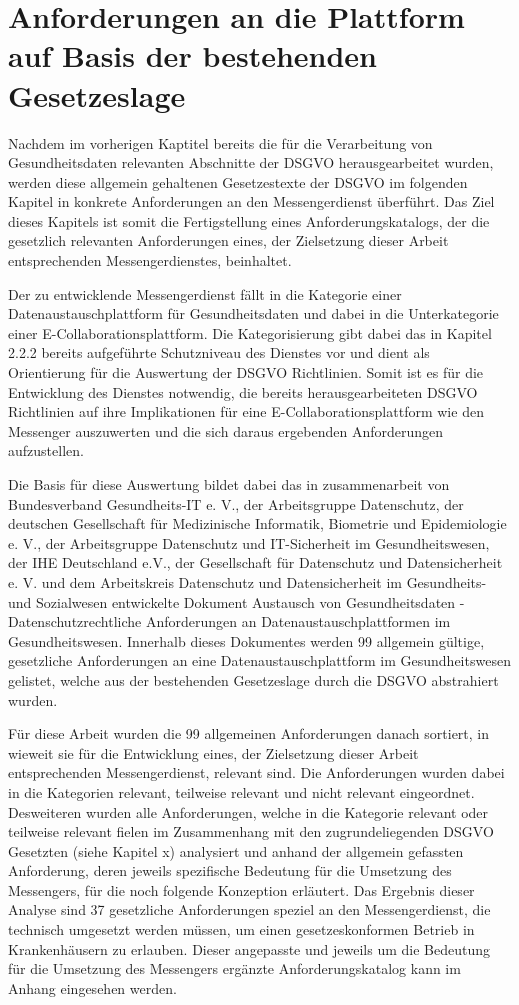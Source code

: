 \section{Anforderungen an die Plattform auf Basis der bestehenden Gesetzeslage}\label{section:aadpabsbg}
Nachdem im vorherigen Kaptitel bereits die für die Verarbeitung von Gesundheitsdaten relevanten Abschnitte der DSGVO herausgearbeitet wurden, werden diese allgemein gehaltenen Gesetzestexte der DSGVO im folgenden Kapitel in konkrete Anforderungen an den Messengerdienst überführt.  Das Ziel dieses Kapitels ist somit die Fertigstellung eines Anforderungskatalogs, der die gesetzlich relevanten Anforderungen eines, der Zielsetzung dieser Arbeit entsprechenden Messengerdienstes, beinhaltet.

Der zu entwicklende Messengerdienst fällt in die Kategorie einer Datenaustauschplattform für Gesundheitsdaten und dabei in die Unterkategorie einer E-Collaborationsplattform. Die Kategorisierung gibt dabei das in Kapitel 2.2.2 bereits aufgeführte Schutzniveau des Dienstes vor und dient als Orientierung für die Auswertung der DSGVO Richtlinien. Somit ist es für die Entwicklung des Dienstes notwendig, die bereits herausgearbeiteten DSGVO Richtlinien auf ihre Implikationen für eine E-Collaborationsplattform wie den Messenger auszuwerten und die sich daraus ergebenden Anforderungen aufzustellen. 

Die Basis für diese Auswertung bildet dabei das in zusammenarbeit von Bundesverband Gesundheits-IT e. V., der Arbeitsgruppe Datenschutz, der deutschen Gesellschaft für Medizinische Informatik, Biometrie und Epidemiologie e. V., der Arbeitsgruppe Datenschutz und IT-Sicherheit im Gesundheitswesen, der IHE Deutschland e.V., der Gesellschaft für Datenschutz und Datensicherheit e. V. und dem Arbeitskreis Datenschutz und Datensicherheit im Gesundheits- und Sozialwesen entwickelte Dokument \glqq Austausch von Gesundheitsdaten - Datenschutzrechtliche Anforderungen an Datenaustauschplattformen im Gesundheitswesen\grqq. Innerhalb dieses Dokumentes werden 99 allgemein gültige, gesetzliche Anforderungen an eine Datenaustauschplattform im Gesundheitswesen gelistet, welche aus der bestehenden Gesetzeslage durch die DSGVO abstrahiert wurden.

Für diese Arbeit wurden die 99 allgemeinen Anforderungen danach sortiert, in wieweit sie für die Entwicklung eines, der Zielsetzung dieser Arbeit entsprechenden Messengerdienst, relevant sind. Die Anforderungen wurden dabei in die Kategorien relevant, teilweise relevant und nicht relevant eingeordnet. Desweiteren wurden alle Anforderungen, welche in die Kategorie relevant oder teilweise relevant fielen im Zusammenhang mit den zugrundeliegenden DSGVO Gesetzten (siehe Kapitel x) analysiert und anhand der allgemein gefassten Anforderung, deren jeweils spezifische Bedeutung für die Umsetzung des Messengers, für die noch folgende Konzeption erläutert. Das Ergebnis dieser Analyse sind 37 gesetzliche Anforderungen speziel an den Messengerdienst, die technisch umgesetzt werden müssen, um einen gesetzeskonformen Betrieb in Krankenhäusern zu erlauben. Dieser angepasste und jeweils um die Bedeutung für die Umsetzung des Messengers ergänzte Anforderungskatalog kann im Anhang eingesehen werden.

